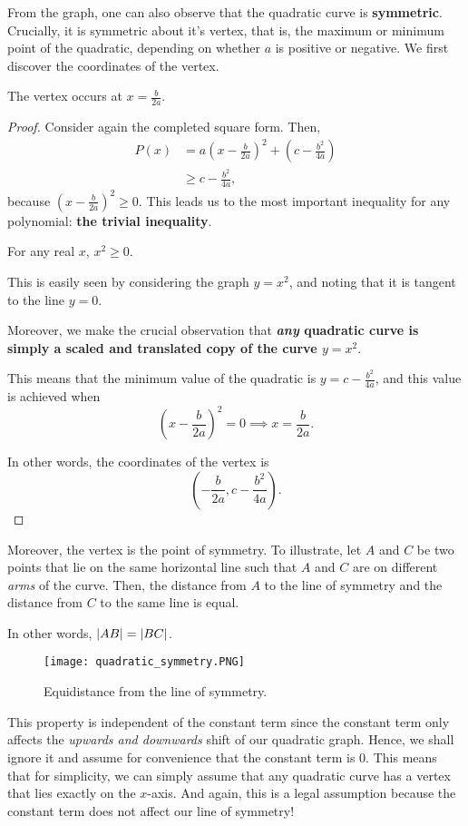 \documentclass[../jarvis.tex]{subfiles}
\begin{document}
From the graph, one can also observe that the quadratic curve is \textbf{symmetric}. Crucially, it is symmetric about it's vertex, that is, the maximum or minimum point of the quadratic, depending on whether $a$ is positive or negative. We first discover the coordinates of the vertex.
\begin{proposition}
    The vertex occurs at $x=\frac{b}{2a}$.
\end{proposition}
\begin{proof}
    Consider again the completed square form. Then,
   \begin{align*}
        P(x)&=a\left(x-\frac{b}{2a}\right)^2+\left(c-\frac{b^2}{4a}\right) \\
        &\geq c-\frac{b^2}{4a},
   \end{align*}
   because $\left(x-\frac{b}{2a}\right)^2\geq 0$. This leads us to the most important inequality for any polynomial: \textbf{the trivial inequality}.
   \begin{proposition}
       For any real $x$, $x^2\geq 0$.
   \end{proposition}
   This is easily seen by considering the graph $y=x^2$, and noting that it is tangent to the line $y=0$. 
   
   Moreover, we make the crucial observation that \textbf{\textit{any} quadratic curve is simply a scaled and translated copy of the curve $y=x^2$}.

   This means that the minimum value of the quadratic is $y=c-\frac{b^2}{4a}$, and this value is achieved when $$\left(x-\frac{b}{2a}\right)^2=0 \implies x=\frac{b}{2a}.$$

   In other words, the coordinates of the vertex is $$\left(-\frac{b}{2a},c-\frac{b^2}{4a}\right).$$
\end{proof}
Moreover, the vertex is the point of symmetry. To illustrate, let $A$ and $C$ be two points that lie on the same horizontal line such that $A$ and $C$ are on different \textit{arms} of the curve. Then, the distance from $A$ to the line of symmetry and the distance from $C$ to the same line is equal.

In other words, $\left\lvert AB \right\rvert=\left\lvert BC \right\rvert$.
\begin{figure}[H]
    \centering
    \texttt{[image: quadratic\_symmetry.PNG]}
    \caption{Equidistance from the line of symmetry.}
\end{figure}

This property is independent of the constant term since the constant term only affects the \textit{upwards and downwards} shift of our quadratic graph. Hence, we shall ignore it and assume for convenience that the constant term is $0$. This means that for simplicity, we can simply assume that any quadratic curve has a vertex that lies exactly on the $x$-axis. And again, this is a legal assumption because the constant term does not affect our line of symmetry!
\end{document}
